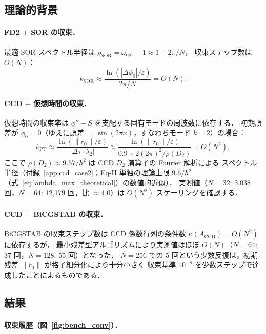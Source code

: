 \subsection{理論的背景}

\paragraph{FD2 $+$ SOR の収束．}
最適 SOR スペクトル半径は $\rho_{\mathrm{SOR}} = \omega_{\mathrm{opt}} - 1 \approx 1 - 2\pi/N$，
収束ステップ数は $O(N)$：
\begin{equation}
  k_{\mathrm{SOR}} \approx \frac{\ln(|\Delta\phi_0|/\varepsilon)}{2\pi/N}
  = O(N).
\end{equation}

\paragraph{CCD $+$ 仮想時間の収束．}
仮想時間の収束率は $\phi'' - S$ を支配する固有モードの周波数に依存する．
初期誤差が $\phi_0 = 0$（ゆえに誤差 $= \sin(2\pi x)$，すなわちモード $k=2$）の場合：
\begin{equation}
  k_{\mathrm{PT}}
  \approx \frac{\ln(\|r_0\|/\varepsilon)}{|{\Delta\tau \cdot \lambda_2}|}
  \approx \frac{\ln(\|r_0\|/\varepsilon)}{0.9 \times 2(2\pi)^2/\rho(D_2)}
  = O(N^2),
\end{equation}
ここで $\rho(D_2) \approx 9.57/h^2$ は CCD $D_2$ 演算子の Fourier 解析による
スペクトル半径（付録~\ref{app:ccd_case2}；Eq-II 単独の理論上限 $9.6/h^2$
（式~\eqref{eq:lambda_max_theoretical}）の数値的近似）．
実測値（$N=32$: 3,038 回，$N=64$: 12,179 回，比 $\approx 4.0$）は $O(N^2)$ スケーリングを確認する．

\paragraph{CCD $+$ BiCGSTAB の収束．}
BiCGSTAB の収束ステップ数は CCD 係数行列の条件数
$\kappa(A_{\mathrm{CCD}}) = O(N^2)$ に依存するが，
最小残差型アルゴリズムにより実測値はほぼ $O(N)$（$N=64$: 37 回，$N=128$: 55 回）となった．
$N=256$ での 5 回という少数反復は，初期残差 $\|r_0\|$ が格子細分化により十分小さく
収束基準 $10^{-8}$ を少数ステップで達成したことによるものである．

\subsection{結果}

\paragraph{収束履歴（図~\ref{fig:bench_conv}）．}

